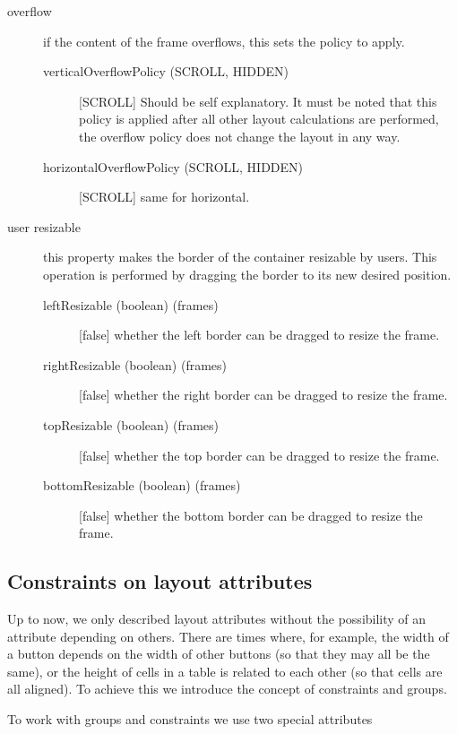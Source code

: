 \begin{description}
\item[overflow] if the content of the frame overflows, this sets the policy to apply.
\begin{description}
    \item[verticalOverflowPolicy (SCROLL, HIDDEN)] [SCROLL] Should be self explanatory. It must be noted that this policy is applied after all other layout calculations are performed, the overflow policy does not change the layout in any way.
    \item[horizontalOverflowPolicy (SCROLL, HIDDEN)] [SCROLL] same for horizontal.
\end{description}

\item[user resizable] this property makes the border of the container resizable by users. This operation is performed by dragging the border to its new desired position.
\begin{description}
    \item[leftResizable (boolean) (frames)] [false] whether the left border can be dragged to resize the frame.
    \item[rightResizable (boolean) (frames)] [false] whether the right border can be dragged to resize the frame.
    \item[topResizable (boolean) (frames)] [false] whether the top border can be dragged to resize the frame.
    \item[bottomResizable (boolean) (frames)] [false] whether the bottom border can be dragged to resize the frame.
\end{description}
\end{description}


\subsection{Constraints on layout attributes}
Up to now, we only described layout attributes without the possibility of an attribute depending on others. There are times where, for example, the width of a button depends on the width of other buttons (so that they may all be the same), or the height of cells in a table is related to each other (so that cells are all aligned). To achieve this we introduce the concept of constraints and groups.

To work with groups and constraints we use two special attributes

